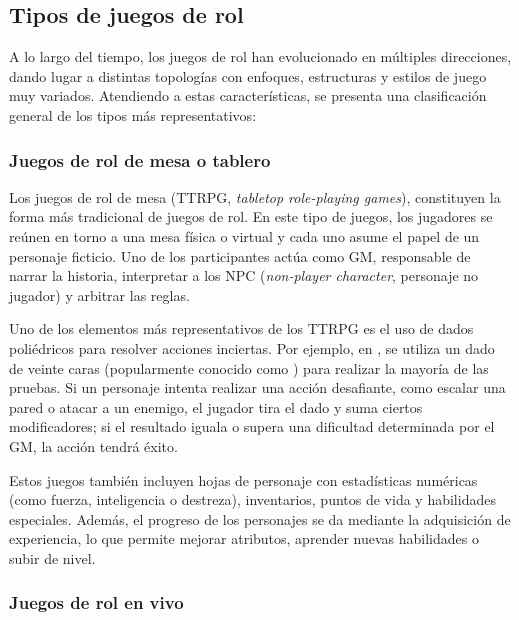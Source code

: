\subsection{Tipos de juegos de rol}
A lo largo del tiempo, los juegos de rol han evolucionado en múltiples direcciones, dando lugar a distintas topologías con enfoques, estructuras y estilos de juego muy variados. Atendiendo a estas características, se presenta una clasificación general de los tipos más representativos:

\subsubsection{Juegos de rol de mesa o tablero}
Los juegos de rol de mesa (TTRPG, \textit{tabletop role-playing games}), constituyen la forma más tradicional de juegos de rol. En este tipo de juegos, los jugadores se reúnen en torno a una mesa física o virtual y cada uno asume el papel de un personaje ficticio. Uno de los participantes actúa como GM, responsable de narrar la historia, interpretar a los NPC (\textit{non-player character}, personaje no jugador) y arbitrar las reglas.

\medskip

Uno de los elementos más representativos de los TTRPG es el uso de dados poliédricos para resolver acciones inciertas. Por ejemplo, en \cite{ogdnd}, se utiliza un dado de veinte caras (popularmente conocido como ) para realizar la mayoría de las pruebas. Si un personaje intenta realizar una acción desafiante, como escalar una pared o atacar a un enemigo, el jugador tira el dado y suma ciertos modificadores; si el resultado iguala o supera una dificultad determinada por el GM, la acción tendrá éxito.

\medskip

Estos juegos también incluyen hojas de personaje con estadísticas numéricas (como fuerza, inteligencia o destreza), inventarios, puntos de vida y habilidades especiales. Además, el progreso de los personajes se da mediante la adquisición de experiencia, lo que permite mejorar atributos, aprender nuevas habilidades o subir de nivel.

\subsubsection{Juegos de rol en vivo}

